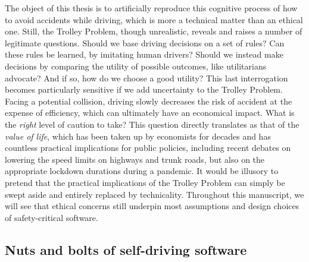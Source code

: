 The object of this thesis is to artificially reproduce this cognitive process of how to avoid accidents while driving, which is more a technical matter than an ethical one. Still, the Trolley Problem, though unrealistic, reveals and raises a number of legitimate questions. Should we base driving decisions on a set of rules? Can these rules be learned, \eg by imitating human drivers? Should we instead make decisions by comparing the utility of possible outcomes, like utilitarians advocate? And if so, how do we choose a good utility? This last interrogation becomes particularly sensitive if we add uncertainty to the Trolley Problem. Facing a potential collision, driving slowly decreases the risk of accident at the expense of efficiency, which can ultimately have an economical impact. What is the \emph{right} level of caution to take? This question directly translates as that of the \emph{value of life}, which has been taken up by economists for decades \citep{Abraham1960,Dreze1962,Schelling1968life,Banzhaf2014,Tirole2017,Charpentier2019} and has countless practical implications for public policies, including recent debates on lowering the speed limits on highways and trunk roads, but also on the appropriate lockdown durations during a pandemic.
It would be illusory to pretend that the practical implications of the Trolley Problem can simply be swept aside and entirely replaced by technicality. Throughout this manuscript, we will see that ethical concerns still underpin most assumptions and design choices of safety-critical software.


\subsection{Nuts and bolts of self-driving software}
\label{sec:nuts-and-bolts}

